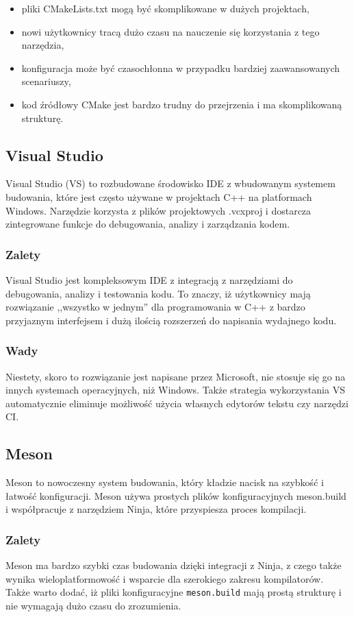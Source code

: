 \begin{itemize}
    \item pliki CMakeLists.txt mogą być skomplikowane w dużych projektach,
    \item nowi użytkownicy tracą dużo czasu na nauczenie się korzystania z tego narzędzia,
    \item konfiguracja może być czasochłonna w przypadku bardziej zaawansowanych scenariuszy,
    \item kod źródłowy CMake jest bardzo trudny do przejrzenia i ma skomplikowaną strukturę.
\end{itemize}

\subsection{Visual Studio}
Visual Studio (VS) to rozbudowane środowisko IDE z wbudowanym systemem budowania, które jest często używane w projektach C++ na platformach Windows. Narzędzie korzysta z plików projektowych .vcxproj i dostarcza zintegrowane funkcje do debugowania, analizy i zarządzania kodem.

\subsubsection{Zalety}
Visual Studio jest kompleksowym IDE z integracją z narzędziami do debugowania, analizy i testowania kodu. To znaczy, iż użytkownicy mają rozwiązanie ,,wszystko w jednym'' dla programowania w C++ z bardzo przyjaznym interfejsem i dużą ilością rozszerzeń do napisania wydajnego kodu.

\subsubsection{Wady}
Niestety, skoro to rozwiązanie jest napisane przez Microsoft, nie stosuje się go na innych systemach operacyjnych, niż Windows. Także strategia wykorzystania VS automatycznie eliminuje możliwość użycia własnych edytorów tekstu czy narzędzi CI.

\subsection{Meson}
Meson to nowoczesny system budowania, który kładzie nacisk na szybkość i łatwość konfiguracji. Meson używa prostych plików konfiguracyjnych meson.build i współpracuje z narzędziem Ninja, które przyspiesza proces kompilacji.

\subsubsection{Zalety}
Meson ma bardzo szybki czas budowania dzięki integracji z Ninja, z czego także wynika wieloplatformowość i wsparcie dla szerokiego zakresu kompilatorów. Także warto dodać, iż  pliki konfiguracyjne \texttt{meson.build} mają prostą strukturę i nie wymagają dużo czasu do zrozumienia.

